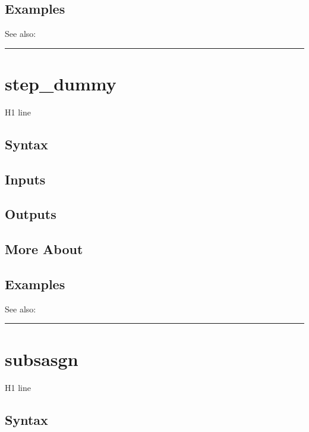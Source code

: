\documentclass[letterpaper,10pt,english]{sphinxmanual}
\begin{document}
\subsection{Examples}
\label{classes/time_series/@ts/ts:id541}
See also:


\bigskip\hrule{}\bigskip



\section{step\_dummy}
\label{classes/time_series/@ts/ts:id542}\label{classes/time_series/@ts/ts:step-dummy}
H1 line


\subsection{Syntax}
\label{classes/time_series/@ts/ts:id543}

\subsection{Inputs}
\label{classes/time_series/@ts/ts:id544}

\subsection{Outputs}
\label{classes/time_series/@ts/ts:id545}

\subsection{More About}
\label{classes/time_series/@ts/ts:id546}

\subsection{Examples}
\label{classes/time_series/@ts/ts:id547}
See also:


\bigskip\hrule{}\bigskip



\section{subsasgn}
\label{classes/time_series/@ts/ts:id548}\label{classes/time_series/@ts/ts:subsasgn}
H1 line


\subsection{Syntax}
\label{classes/time_series/@ts/ts:id549}
\end{document}
